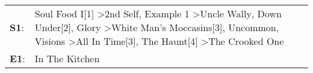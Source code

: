 \begin{supertabular}{p{0.03\textwidth}p{0.92\textwidth}}
 \textbf{S1}:  &  Soul Food I[1]\textsuperscript{} \textgreater \enspace 2nd Self\textsuperscript{}, \enspace Example 1\textsuperscript{} \textgreater \enspace Uncle Wally\textsuperscript{}, \enspace Down Under[2]\textsuperscript{}, \enspace Glory\textsuperscript{} \textgreater \enspace White Man's Moccasins[3]\textsuperscript{}, \enspace Uncommon\textsuperscript{}, \enspace Visions\textsuperscript{} \textgreater \enspace All In Time[3]\textsuperscript{}, \enspace The Haunt[4]\textsuperscript{} \textgreater \enspace The Crooked One\textsuperscript{}  \enspace  \\
 \textbf{E1}:  &                                                                                                                                                                                                                                                                                                                                                                                                                                                                                                                           In The Kitchen\textsuperscript{}  \enspace  \\
\end{supertabular}
